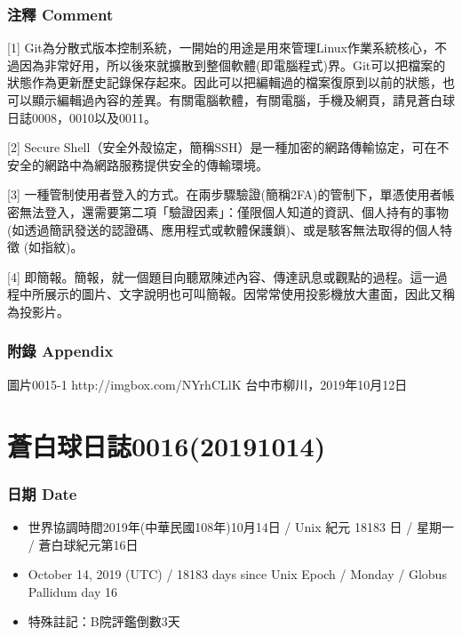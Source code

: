 \documentclass[a5paper, 12pt
]{book}
\providecommand{\tightlist}{%
  \setlength{\itemsep}{0pt}\setlength{\parskip}{0pt}}
\begin{document}
\hypertarget{ux6ce8ux91cb-comment-8}{%
\subsubsection{注釋 Comment}\label{ux6ce8ux91cb-comment-8}}

{[}1{]}
Git為分散式版本控制系統，一開始的用途是用來管理Linux作業系統核心，不過因為非常好用，所以後來就擴散到整個軟體(即電腦程式)界。Git可以把檔案的狀態作為更新歷史記錄保存起來。因此可以把編輯過的檔案復原到以前的狀態，也可以顯示編輯過內容的差異。有關電腦軟體，有關電腦，手機及網頁，請見蒼白球日誌0008，0010以及0011。

{[}2{]} Secure
Shell（安全外殼協定，簡稱SSH）是一種加密的網路傳輸協定，可在不安全的網路中為網路服務提供安全的傳輸環境。

{[}3{]}
一種管制使用者登入的方式。在兩步驟驗證(簡稱2FA)的管制下，單憑使用者帳密無法登入，還需要第二項「驗證因素」：僅限個人知道的資訊、個人持有的事物
(如透過簡訊發送的認證碼、應用程式或軟體保護鎖)、或是駭客無法取得的個人特徵
(如指紋)。

{[}4{]}
即簡報。簡報，就一個題目向聽眾陳述內容、傳達訊息或觀點的過程。這一過程中所展示的圖片、文字說明也可叫簡報。因常常使用投影機放大畫面，因此又稱為投影片。

\hypertarget{ux9644ux9304-appendix-7}{%
\subsubsection{附錄 Appendix}\label{ux9644ux9304-appendix-7}}

圖片0015-1 http://imgbox.com/NYrhCLlK 台中市柳川，2019年10月12日

\hypertarget{ux84bcux767dux7403ux65e5ux8a8c001620191014}{%
\section{蒼白球日誌0016(20191014)}\label{ux84bcux767dux7403ux65e5ux8a8c001620191014}}

\hypertarget{ux65e5ux671f-date-13}{%
\subsubsection{日期 Date}\label{ux65e5ux671f-date-13}}

\begin{itemize}
\tightlist
\item
  世界協調時間2019年(中華民國108年)10月14日 / Unix 紀元 18183 日 /
  星期一 / 蒼白球紀元第16日
\item
  October 14, 2019 (UTC) / 18183 days since Unix Epoch / Monday / Globus
  Pallidum day 16
\item
  特殊註記：B院評鑑倒數3天
\end{itemize}
\end{document}
